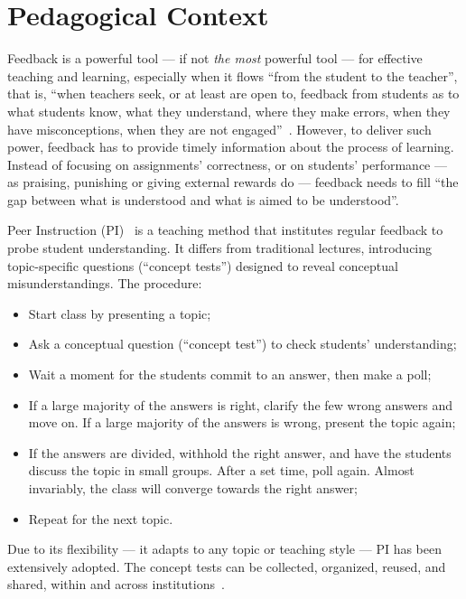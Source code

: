 \section{Pedagogical Context} \label{sec:relatedwork}
Feedback is a powerful tool --- if not \emph{the most} powerful tool --- for effective teaching and learning, especially when it flows “from the student to the teacher”, that is, “when teachers seek, or at least are open to, feedback from students as to what students know, what they understand, where they make errors, when they have misconceptions, when they are not engaged”~\cite{hattie2009visiblelearning}. However, to deliver such power, feedback has to provide timely information about the process of learning. Instead of focusing on assignments' correctness, or on students' performance --- as praising, punishing or giving external rewards do --- feedback needs to fill “the gap between what is understood and what is aimed to be understood”. %

Peer Instruction (PI)~\cite{mazur1997peer} is a teaching method that institutes regular feedback to probe student understanding. It differs from traditional lectures, introducing topic-specific questions (“concept tests”) designed to reveal conceptual misunderstandings. The procedure:

\begin{itemize}
    \item Start class by presenting a topic;
    \item Ask a conceptual question (“concept test”) to check students’ understanding;
    \item Wait a moment for the students commit to an answer, then make a poll;
    \item If a large majority of the answers is right, clarify the few wrong answers and move on. If a large majority of the answers is wrong, present the topic again;
    \item If the answers are  divided, withhold the right answer, and have the students discuss the topic in small groups. After a set time, poll again. Almost invariably, the class will converge towards the right answer;
    \item Repeat for the next topic.
\end{itemize}

Due to its flexibility --- it adapts to any topic or teaching style --- PI has been extensively adopted.
The concept tests can be collected, organized, reused, and shared, within and across institutions~\cite{crouch2001peer, mazur1997peer}.

